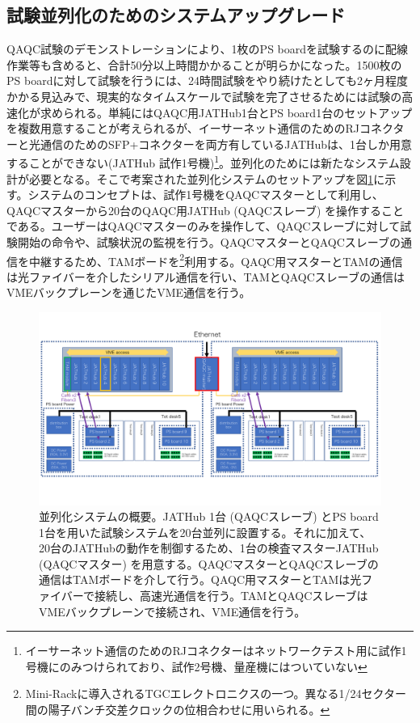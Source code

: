 \subsection{試験並列化のためのシステムアップグレード}
\label{subsec_parallel}
QAQC試験のデモンストレーションにより、1枚のPS boardを試験するのに配線作業等も含めると、合計50分以上時間かかることが明らかになった。1500枚のPS boardに対して試験を行うには、24時間試験をやり続けたとしても2ヶ月程度かかる見込みで、現実的なタイムスケールで試験を完了させるためには試験の高速化が求められる。単純にはQAQC用JATHub1台とPS board1台のセットアップを複数用意することが考えられるが、イーサーネット通信のためのRJコネクターと光通信のためのSFP+コネクターを両方有しているJATHubは、1台しか用意することができない(JATHub 試作1号機)\footnote{イーサーネット通信のためのRJコネクターはネットワークテスト用に試作1号機にのみつけられており、試作2号機、量産機にはついていない}。並列化のためには新たなシステム設計が必要となる。そこで考案された並列化システムのセットアップを図\ref{QAQCpararell}に示す。システムのコンセプトは、試作1号機をQAQCマスターとして利用し、QAQCマスターから20台のQAQC用JATHub (QAQCスレーブ) を操作することである。ユーザーはQAQCマスターのみを操作して、QAQCスレーブに対して試験開始の命令や、試験状況の監視を行う。QAQCマスターとQAQCスレーブの通信を中継するため、TAMボードを\footnote{Mini-Rackに導入されるTGCエレクトロニクスの一つ。異なる1/24セクター間の陽子バンチ交差クロックの位相合わせに用いられる。}利用する。QAQC用マスターとTAMの通信は光ファイバーを介したシリアル通信を行い、TAMとQAQCスレーブの通信はVMEバックプレーンを通じたVME通信を行う。
\begin{figure} 
    \centering
    \includegraphics[width=16cm]{fig/QAQC/QAQCpararell.pdf}
    \caption[並列化システムの概要]{並列化システムの概要。JATHub 1台 (QAQCスレーブ) とPS board 1台を用いた試験システムを20台並列に設置する。それに加えて、20台のJATHubの動作を制御するため、1台の検査マスターJATHub (QAQCマスター) を用意する。QAQCマスターとQAQCスレーブの通信はTAMボードを介して行う。QAQC用マスターとTAMは光ファイバーで接続し、高速光通信を行う。TAMとQAQCスレーブはVMEバックプレーンで接続され、VME通信を行う。}
    \label{QAQCpararell}
\end{figure}

